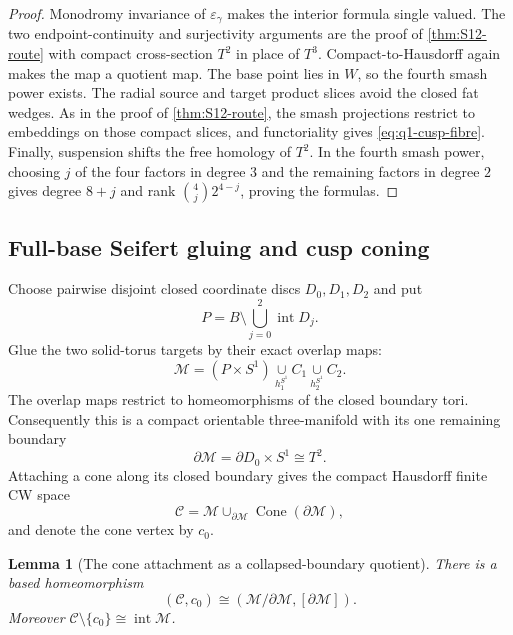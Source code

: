 \documentclass[11pt,letterpaper]{article}
\numberwithin{equation}{section}
\newtheorem{lemma}[theorem]{Lemma}
\theoremstyle{definition}
\theoremstyle{remark}
\newcommand{\Cone}{\operatorname{Cone}}
\begin{document}
\begin{proof}
Monodromy invariance of $\varepsilon_\gamma$ makes the interior formula
single valued.  The two endpoint-continuity and surjectivity arguments are
the proof of \cref{thm:S12-route} with compact cross-section $T^2$ in
place of $T^3$.  Compact-to-Hausdorff again makes the map a quotient map.
The base point lies in $W$, so the fourth smash power exists.  The radial
source and target product slices avoid the closed fat wedges.  As in the
proof of \cref{thm:S12-route}, the smash projections restrict to
embeddings on those compact slices, and functoriality gives
\cref{eq:q1-cusp-fibre}.  Finally,
suspension shifts the free homology of $T^2$.  In the fourth smash power,
choosing $j$ of the four factors in degree $3$ and the remaining factors
in degree $2$ gives degree $8+j$ and rank
$\binom4j2^{4-j}$, proving the formulas.
\end{proof}

\subsection{Full-base Seifert gluing and cusp coning}

Choose pairwise disjoint closed coordinate discs $D_0,D_1,D_2$ and put
\begin{equation}
 P=B\setminus\bigcup_{j=0}^2\operatorname{int}D_j.
 \label{eq:pair-of-pants}
\end{equation}
Glue the two solid-torus targets by their exact overlap maps:
\begin{equation}
 \mathcal M=(P\times S^1)
 \underset{h_1^{S^1}}{\cup}C_1
 \underset{h_2^{S^1}}{\cup}C_2.
 \label{eq:M-definition}
\end{equation}
The overlap maps restrict to homeomorphisms of the closed boundary tori.
Consequently this is a compact orientable three-manifold with its one remaining boundary
\begin{equation}
 \partial\mathcal M=\partial D_0\times S^1\cong T^2.
 \label{eq:M-boundary}
\end{equation}
Attaching a cone along its closed boundary gives the compact Hausdorff finite
CW space
\begin{equation}
 \mathcal C=\mathcal M\cup_{\partial\mathcal M}
 \Cone(\partial\mathcal M),
 \label{eq:C-definition}
\end{equation}
and denote the cone vertex by $c_0$.

\begin{lemma}[The cone attachment as a collapsed-boundary quotient]
\label{lem:C-as-boundary-quotient}
There is a based homeomorphism
\begin{equation}
 (\mathcal C,c_0)
 \cong
 (\mathcal M/\partial\mathcal M,[\partial\mathcal M]).
 \label{eq:C-as-boundary-quotient}
\end{equation}
Moreover
\(\mathcal C\setminus\{c_0\}\cong\operatorname{int}\mathcal M\).
\end{lemma}
\end{document}

